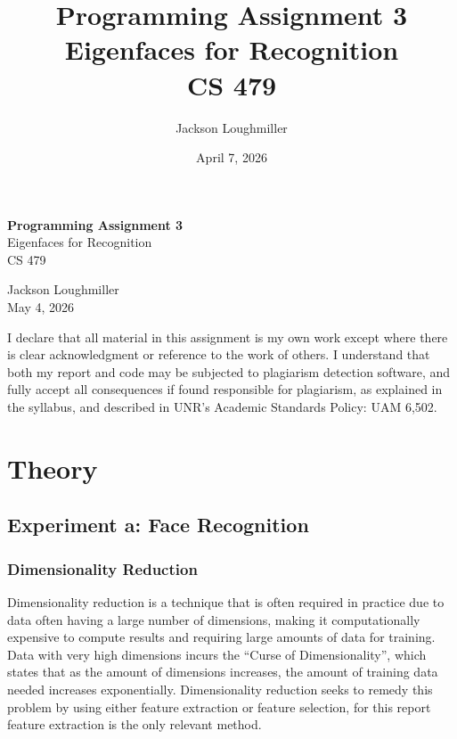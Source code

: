 \documentclass{article}
\title{Programming Assignment 3 \\ \large Eigenfaces for Recognition \\ CS 479}
\author{Jackson Loughmiller}
\date{April 7, 2026}
\begin{document}
\begin{titlepage}
    \centering
    \vspace*{\fill}
    
    {\huge \textbf{Programming Assignment 3}} \\
    \vspace{0.5cm}
    {\Large Eigenfaces for Recognition} \\
    \vspace{0.5cm}
    {\large CS 479}
    
    \vspace{2cm}
    
    {\large Jackson Loughmiller} \\
    \vspace{0.2cm}
    {\large May 4, 2026}
    
    \vspace{3cm}
    
    \noindent I declare that all material in this assignment is my own work except
    where there is clear acknowledgment or reference to the work of others.
    I understand that both my report and code may be subjected to plagiarism
    detection software, and fully accept all consequences if found
    responsible for plagiarism, as explained in the syllabus, and described
    in UNR's Academic Standards Policy: UAM 6,502.
    
    \vspace*{\fill}
\end{titlepage}

\newpage

\section{Theory}\label{theory}

\subsection{Experiment a: Face Recognition}\label{experiment-a}

\subsubsection*{Dimensionality Reduction}\label{dimensionality-reduction}

Dimensionality reduction is a technique that is often required in practice due 
to data often having a large number of dimensions, making it computationally expensive to 
compute results and requiring large amounts of data for training. Data with very high 
dimensions incurs the “Curse of Dimensionality”, which states that as the amount of 
dimensions increases, the amount of training data needed increases exponentially. 
Dimensionality reduction seeks to remedy this problem by using either feature extraction 
or feature selection, for this report feature extraction is the only relevant method. 
\end{document}
